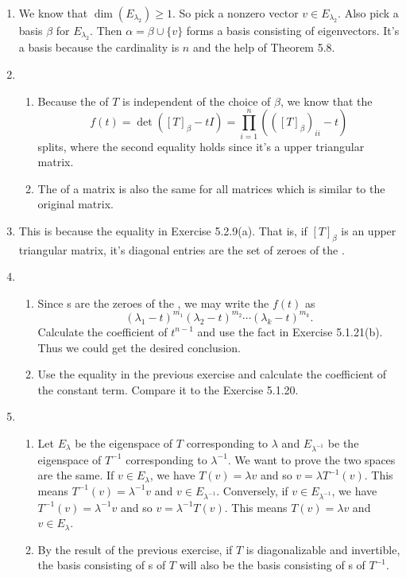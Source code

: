 \begin{enumerate}
\item We know that $\dim(E_{\lambda_2})\geq 1$. So pick a nonzero vector $v\in E_{\lambda_2}$. Also pick a basis $\beta $ for $E_{\lambda_2}$. Then $\alpha=\beta\cup \{v\}$ forms a basis consisting of eigenvectors. It's a basis because the cardinality is $n$ and the help of Theorem 5.8.
\item \begin{enumerate}
\item Because the \charpoly{} of $T$ is independent of the choice of $\beta $, we know that the \charpoly{} 
\[f(t)=\det([T]_{\beta}-tI)=\prod_{i=1}^n{(([T]_{\beta})_{ii}-t)}\]
splits, where the second equality holds since it's a upper triangular matrix.
\item The \charpoly{} of a matrix is also the same for all matrices which is similar to the original matrix.
\end{enumerate}
\item This is because the equality in Exercise 5.2.9(a). That is, if $[T]_{\beta }$ is an upper triangular matrix, it's diagonal entries are the set of zeroes of the \charpoly{}.
\item \begin{enumerate}
\item Since \egva s are the zeroes of the \charpoly{}, we may write the \charpoly{} $f(t)$ as 
\[(\lambda_1-t)^{m_1}(\lambda_2-t)^{m_2}\cdots (\lambda_k-t)^{m_k}.\]
Calculate the coefficient of $t^{n-1}$ and use the fact in Exercise 5.1.21(b). Thus we could get the desired conclusion.
\item Use the equality in the previous exercise and calculate the coefficient of the constant term. Compare it to the Exercise 5.1.20.
\end{enumerate}
\item \begin{enumerate}
\item Let $E_{\lambda}$ be the eigenspace of $T$ corresponding to $\lambda$ and $E_{\lambda^{-1}}$ be the eigenspace of $T^{-1}$ corresponding to $\lambda^{-1}$. We want to prove the two spaces are the same. If $v\in E_{\lambda}$, we have $T(v)=\lambda v$ and so $v=\lambda T^{-1}(v)$. This means $T^{-1}(v)=\lambda^{-1}v$ and $v\in E_{\lambda^{-1}}$. Conversely, if $v\in E_{\lambda^{-1}}$, we have $T^{-1}(v)=\lambda^{-1}v$ and so $v=\lambda^{-1} T(v)$. This means $T(v)=\lambda v$ and $v\in E_{\lambda}$.
\item By the result of the previous exercise, if $T$ is diagonalizable and invertible, the basis consisting of \egve s of $T$ will also be the basis consisting of \egve s of $T^{-1}$.

\end{enumerate}
\end{enumerate}
